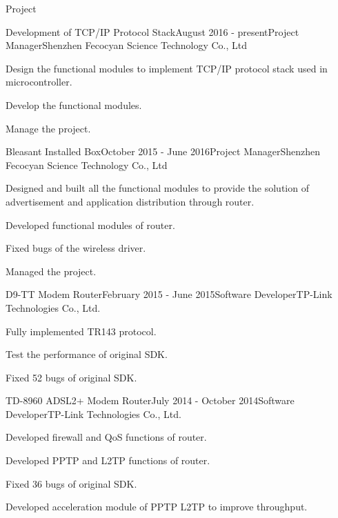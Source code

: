 \documentclass{resume} %
\begin{document}
\begin{rSection}{Project}
	
\begin{rSubsection}{Development of TCP/IP Protocol Stack}{August 2016 - present}{Project Manager}{Shenzhen Fecocyan Science Technology Co., Ltd}
	\item Design the functional modules to implement TCP/IP protocol stack used in microcontroller.
	\item Develop the functional modules.
	\item Manage the project.
\end{rSubsection}


\begin{rSubsection}{Bleasant Installed Box}{October 2015 - June 2016}{Project Manager}{Shenzhen Fecocyan Science Technology Co., Ltd}
	\item Designed and built all the functional modules to provide the solution of advertisement and application distribution through router.
	\item Developed functional modules of router.
	\item Fixed bugs of the wireless driver.
	\item Managed the project.
\end{rSubsection}


\begin{rSubsection}{D9-TT Modem Router}{February 2015 - June 2015}{Software Developer}{TP-Link Technologies Co., Ltd.}
	\item Fully implemented TR143 protocol.
	\item Test the performance of original SDK.
	\item Fixed 52 bugs of original SDK.
\end{rSubsection}


\begin{rSubsection}{TD-8960 ADSL2+ Modem Router}{July 2014 - October 2014}{Software Developer}{TP-Link Technologies Co., Ltd.}
	\item Developed firewall and QoS functions of router.
	\item Developed PPTP and L2TP functions of router.
	\item Fixed 36 bugs of original SDK.
	\item Developed acceleration module of PPTP L2TP to improve throughput.
\end{rSubsection}


\end{rSection}
\end{document}
